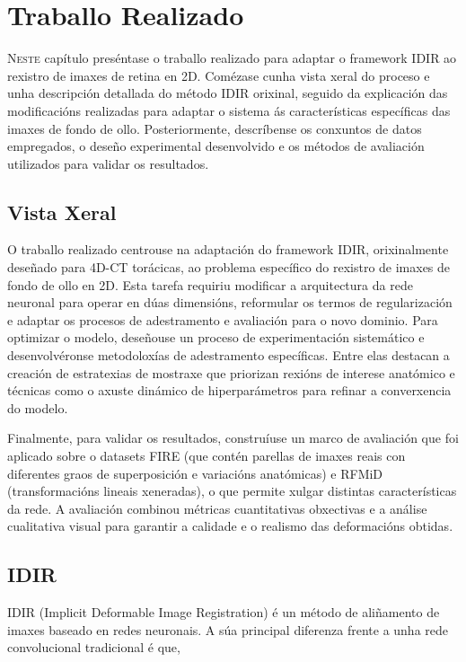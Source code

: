 \chapter{Traballo Realizado}
\label{chap:Traballo Realizado}

\lettrine{N}{este} capítulo preséntase o traballo realizado para adaptar o framework IDIR ao rexistro de imaxes de retina en 2D. Comézase cunha vista xeral do proceso e unha descripción detallada do método IDIR orixinal, seguido da explicación das modificacións realizadas para adaptar o sistema ás características específicas das imaxes de fondo de ollo. Posteriormente, descríbense os conxuntos de datos empregados, o deseño experimental desenvolvido e os métodos de avaliación utilizados para validar os resultados.

\section{Vista Xeral}
\label{sec:VistaXeral}

O traballo realizado centrouse na adaptación do framework IDIR, orixinalmente deseñado para 4D-CT torácicas, ao problema específico do rexistro de imaxes de fondo de ollo en 2D. Esta tarefa requiriu modificar a arquitectura da rede neuronal para operar en dúas dimensións, reformular os termos de regularización e adaptar os procesos de adestramento e avaliación para o novo dominio.
Para optimizar o modelo, deseñouse un proceso de experimentación sistemático e desenvolvéronse metodoloxías de adestramento específicas. Entre elas destacan a creación de estratexias de mostraxe que priorizan rexións de interese anatómico e técnicas como o axuste dinámico de hiperparámetros para refinar a converxencia do modelo.

Finalmente, para validar os resultados, construíuse un marco de avaliación que foi aplicado sobre o datasets FIRE (que contén parellas de imaxes reais con diferentes graos de superposición e variacións anatómicas) e RFMiD (transformacións lineais xeneradas), o que permite xulgar distintas características da rede. A avaliación combinou métricas cuantitativas obxectivas e a análise cualitativa visual para garantir a calidade e o realismo das deformacións obtidas.

\section{IDIR}
\label{sec:IDIR}

IDIR (Implicit Deformable Image Registration) é un método de aliñamento de imaxes baseado en redes neuronais. 
A súa principal diferenza frente a unha rede convolucional tradicional é que, 

